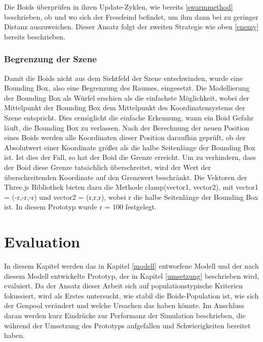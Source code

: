 \documentclass[draft=false
              ,paper=a4
              ,twoside=false
              ,fontsize=11pt
              ,headsepline
              ,BCOR10mm
              ,DIV11
              ,bibtotoc
              ,liststotoc
              ]{scrbook}
\begin{document}
Die Boids überprüfen in ihren Update-Zyklen, wie bereits \ref{swarmmethod} beschrieben, ob und wo sich der Fressfeind befindet, um ihm dann bei zu geringer Distanz auszuweichen. Dieser Ansatz folgt der zweiten Strategie wie oben \ref{enemy} bereits beschrieben.
\subsection{Begrenzung der Szene}\label{box}
Damit die Boids nicht aus dem Sichtfeld der Szene entschwinden, wurde eine Bounding Box, also eine Begrenzung des Raumes, eingesetzt. Die Modellierung der Bounding Box als Würfel erschien als die einfachste Möglichkeit, wobei der Mittelpunkt der Bounding Box dem Mittelpunkt des Koordinatensystems der Szene entspricht. Dies ermöglicht die einfache Erkennung, wann ein Boid Gefahr läuft, die Bounding Box zu verlassen. Nach der Berechnung der neuen Position eines Boids werden alle Koordinaten dieser Position daraufhin geprüft, ob der Absolutwert einer Koordinate größer als die halbe Seitenlänge der Bounding Box ist. Ist dies der Fall, so hat der Boid die Grenze erreicht. Um zu verhindern, dass der Boid diese Grenze tatsächlich überschreitet, wird der Wert der überschreitenden Koordinate auf den Grenzwert beschränkt. Die Vektoren der Three.js Bibliothek bieten dazu die Methode clamp(vector1, vector2), mit vector1 = (-r,-r,-r) und vector2 = (r,r,r), wobei r die halbe Seitenlänge der Bounding Box ist. In diesem Prototyp wurde r = 100 festgelegt.

\chapter{Evaluation}\label{eval}
In diesem Kapitel werden das in Kapitel \ref{modell} entworfene Modell und der nach diesem Modell entwickelte Prototyp, der in Kapitel \ref{umsetzung} beschrieben wird, evaluiert. Da der Ansatz dieser Arbeit sich auf populationstypische Kriterien fokussiert, wird als Erstes untersucht, wie stabil die Boids-Population ist, wie sich der Genpool verändert und welche Ursachen das haben könnte. Im Anschluss daran werden kurz Eindrücke zur Performanz der Simulation beschrieben, die während der Umsetzung des Prototyps aufgefallen und Schwierigkeiten bereitet haben.
\end{document}
